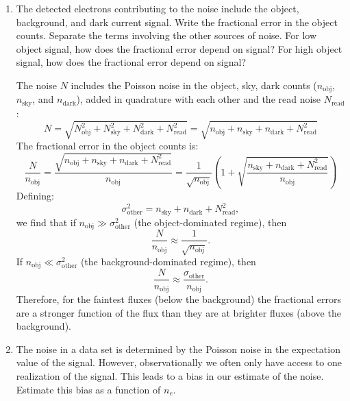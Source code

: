 \begin{enumerate}
\item The detected electrons contributing to the noise include the
object, background, and dark current signal. Write the fractional
error in the object counts. Separate the terms involving the other
sources of noise. For low object signal, how does the fractional error
depend on signal? For high object signal, how does the fractional
error depend on signal?

\begin{answer}
The noise $N$ includes the Poisson noise in the object, sky, dark
counts ($n_\mathrm{obj}$, $n_\mathrm{sky}$, and $n_\mathrm{dark}$),
added in quadrature with each other and the read noise
$N_\mathrm{read}$:
\begin{equation}
\label{ }
N
= \sqrt{N_\mathrm{obj}^2+N_\mathrm{sky}^2+N_\mathrm{dark}^2+N_\mathrm{read}^2}=\sqrt{n_\mathrm{obj}+n_\mathrm{sky}+n_\mathrm{dark}+N_\mathrm{read}^2}
\end{equation}
The fractional error in the object counts is:
\begin{equation}
\label{ }
\frac{N}{n_\mathrm{obj}}=\frac{\sqrt{n_\mathrm{obj}+n_\mathrm{sky}+n_\mathrm{dark}+N_\mathrm{read}^2}}{n_\mathrm{obj}}
= \frac{1}{\sqrt{n_\mathrm{obj}}}\left(1+
\sqrt{\frac{n_\mathrm{sky}+n_\mathrm{dark}+N_\mathrm{read}^2}{n_\mathrm{obj}}}\right)
\end{equation}
Defining:
\begin{equation}
\sigma_\mathrm{other}^2 =
n_\mathrm{sky}+n_\mathrm{dark}+N_\mathrm{read}^2,
\end{equation}
we find that if $n_\mathrm{obj}\gg \sigma_\mathrm{other}^2$ (the
object-dominated regime), then
\begin{equation}
\frac{N}{n_\mathrm{obj}} \approx \frac{1}{\sqrt{n_\mathrm{obj}}}.
\end{equation}
If $n_\mathrm{obj}\ll \sigma_\mathrm{other}^2$ (the
background-dominated regime), then
\begin{equation}
\frac{N}{n_\mathrm{obj}} \approx \frac{\sigma_\mathrm{other}}{n_\mathrm{obj}}.
\end{equation}
Therefore, for the faintest fluxes (below the background) the
fractional errors are a stronger function of the flux than they are at
brighter fluxes (above the background).
\end{answer}
\item The noise in a data set is determined by the Poisson noise in
the expectation value of the signal. However, observationally we often
only have access to one realization of the signal. This leads to a
bias in our estimate of the noise. Estimate this bias as a function of
$n_e$.
\end{enumerate}

